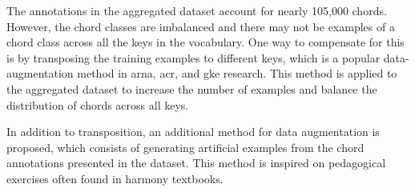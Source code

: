 
The annotations in the aggregated dataset account for nearly
105,000 chords. However, the chord classes are imbalanced
and there may not be examples of a chord class across all
the keys in the vocabulary. One way to compensate for this
is by transposing the training examples to different keys,
which is a popular data-augmentation method in \gls{arna},
\gls{acr}, and \gls{gke} research. This method is applied to
the aggregated dataset to increase the number of examples
and balance the distribution of chords across all keys.

In addition to transposition, an additional method for data
augmentation is proposed, which consists of generating
artificial examples from the chord annotations presented in
the dataset. This method is inspired on pedagogical
exercises often found in harmony textbooks.
